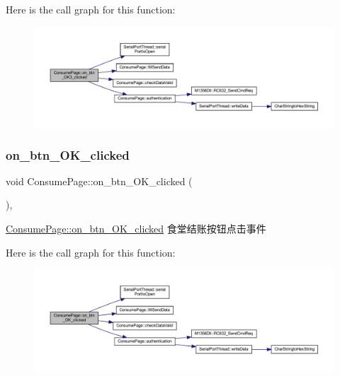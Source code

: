 Here is the call graph for this function\+:
\nopagebreak
\begin{figure}[H]
\begin{center}
\leavevmode
\includegraphics[width=350pt]{class_consume_page_a3d244573d28510df3c7b3ca0d6eb3843_cgraph}
\end{center}
\end{figure}
\mbox{\label{class_consume_page_a5d3f29ff49ea73facf73e34267adf0ed}} 
\subsubsection{\texorpdfstring{on\_btn\_OK\_clicked}{on\_btn\_OK\_clicked}}
{\footnotesize\ttfamily void Consume\+Page\+::on\+\_\+btn\+\_\+\+O\+K\+\_\+clicked (\begin{DoxyParamCaption}{ }\end{DoxyParamCaption})\hspace{0.3cm}{\ttfamily [private]}, {\ttfamily [slot]}}



\mbox{\hyperlink{class_consume_page_a5d3f29ff49ea73facf73e34267adf0ed}{Consume\+Page\+::on\+\_\+btn\+\_\+\+O\+K\+\_\+clicked}} 食堂结账按钮点击事件 

Here is the call graph for this function\+:
\nopagebreak
\begin{figure}[H]
\begin{center}
\leavevmode
\includegraphics[width=350pt]{class_consume_page_a5d3f29ff49ea73facf73e34267adf0ed_cgraph}
\end{center}
\end{figure}
\mbox{\label{class_consume_page_a10832a40b02705ec9c951673e1a7e6da}} 
